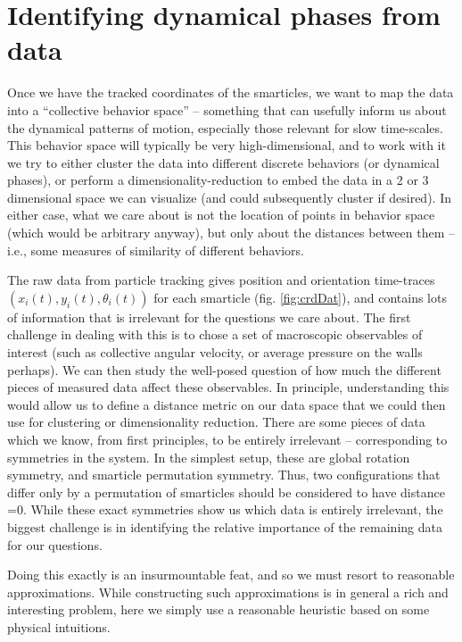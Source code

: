 \documentclass[reprint,prx]{revtex4-1}
\renewcommand{\=}[1]{\stackrel{#1}{=}} %
\renewcommand{\(}{\left (}
\renewcommand{\)}{\right  )}
\renewcommand{\[}{\left [}
\renewcommand{\]}{\right ]}
\newcommand{\<}{\left <}
\renewcommand{\>}{\right >}
\theoremstyle{definition}
\theoremstyle{remark}
\begin{document}
\section{Identifying dynamical phases from data}

Once we have the tracked coordinates of the smarticles, we want to map the data into a ``collective behavior space'' -- something that can usefully inform us about the dynamical patterns of motion, especially those relevant for slow time-scales. This behavior space will typically be very high-dimensional, and to work with it we try to either cluster the data into different discrete behaviors (or dynamical phases), or perform a dimensionality-reduction to embed the data in a 2 or 3 dimensional space we can visualize (and could subsequently cluster if desired). In either case, what we care about is not the location of points in behavior space (which would be arbitrary anyway), but only about the distances between them -- i.e., some measures of similarity of different behaviors. 

The raw data from particle tracking gives position and orientation time-traces $ (x_i(t), y_i(t), \theta_i(t)) $ for each smarticle (fig. \ref{fig:crdDat}), and contains lots of information that is irrelevant for the questions we care about. The first challenge in dealing with this is to chose a set of macroscopic observables of interest (such as collective angular velocity, or average pressure on the walls perhaps). We can then study the well-posed question of how much the different pieces of measured data affect these observables. In principle, understanding this would allow us to define a distance metric on our data space that we could then use for clustering or dimensionality reduction. There are some pieces of data which we know, from first principles, to be entirely irrelevant -- corresponding to symmetries in the system. In the simplest setup, these are global rotation symmetry, and smarticle permutation symmetry. Thus, two configurations that differ only by a permutation of smarticles should be considered to have distance =0. While these exact symmetries show us which data is entirely irrelevant, the biggest challenge is in identifying the relative importance of the remaining data for our questions. 

Doing this exactly is an insurmountable feat, and so we must resort to reasonable approximations. While constructing such approximations is in general a rich and interesting problem, here we simply use a reasonable heuristic based on some physical intuitions. 
\end{document}
